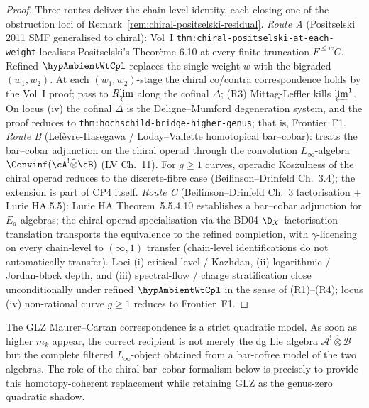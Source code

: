 \begin{proof}
Three routes deliver the chain-level identity, each closing one of
the obstruction loci of
Remark~\ref{rem:chiral-positselski-residual}.
\emph{Route A} (Positselski 2011 SMF generalised to chiral): Vol~I
\texttt{thm:chiral-positselski-at-each-weight} localises Positselski's
Theor\`eme 6.10 at every finite truncation $F^{\le w} C$. Refined
$\hypAmbientWtCpl$ replaces the single weight $w$ with the bigraded
$(w_1, w_2)$. At each $(w_1, w_2)$-stage the chiral co/contra
correspondence holds by the Vol~I proof; pass to $R\!\varprojlim$
along the cofinal $\Delta$; (R3) Mittag-Leffler kills $\varprojlim^1$.
On locus (iv) the cofinal $\Delta$ is the Deligne--Mumford degeneration
system, and the proof reduces to
\texttt{thm:hochschild-bridge-higher-genus}; that is, Frontier~F1.
\emph{Route B} (Lefèvre-Hasegawa / Loday--Vallette homotopical
bar--cobar): treats the bar--cobar adjunction on the chiral operad
through the convolution $L_\infty$-algebra
$\Convinf(\cA^! \widehat\otimes \cB)$ \textup{(}LV Ch.~11\textup{)}.
For $g \ge 1$ curves, operadic Koszulness of the chiral operad reduces
to the discrete-fibre case (Beilinson--Drinfeld Ch.~3.4); the
extension is part of CP4 itself.
\emph{Route C} (Beilinson--Drinfeld Ch.~3 factorisation + Lurie
HA.5.5): Lurie HA Theorem~5.5.4.10 establishes a bar--cobar adjunction
for $E_d$-algebras; the chiral operad specialisation via the BD04
$\D_X$-factorisation translation transports the equivalence to the
refined completion, with $\gamma$-licensing on every chain-level to
$(\infty, 1)$ transfer (chain-level identifications do not
automatically transfer).
Loci (i) critical-level / Kazhdan, (ii) logarithmic / Jordan-block
depth, and (iii) spectral-flow / charge stratification close
unconditionally under refined $\hypAmbientWtCpl$ in the sense of (R1)--(R4);
locus (iv) non-rational curve $g \ge 1$ reduces to Frontier~F1.
\end{proof}

\begin{remark}
\label{rem:glz-homotopy-upgrade}
The GLZ Maurer--Cartan correspondence is a strict quadratic model. As
soon as higher $m_k$ appear, the correct recipient is not merely the dg
Lie algebra $\mathcal{A}^!\widehat\otimes \mathcal{B}$ but the complete
filtered $L_\infty$-object obtained from a bar-cofree model of the two
algebras. The role of the chiral bar--cobar formalism below is
precisely to provide this homotopy-coherent replacement while retaining
GLZ as the genus-zero quadratic shadow.
\end{remark}

